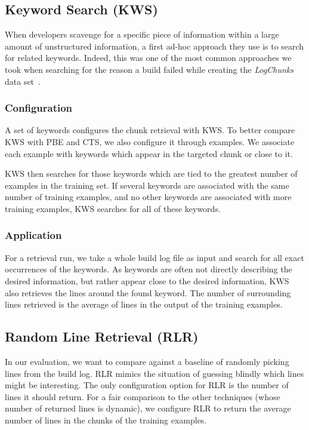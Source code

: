 \subsection{Keyword Search (KWS)}
\label{sec:expl-skws}
When developers scavenge for a specific piece of information within a
large amount of unstructured information, a first ad-hoc approach they
use is to search for related keywords.
Indeed, this was one of the
most common approaches we took when searching for the reason a build
failed while creating the \emph{LogChunks} data
set~\cite{brandt2020logchunks}.

\subsubsection{Configuration}
A set of keywords configures the chunk retrieval with KWS\@.
To better
compare KWS with PBE and CTS, we also configure it through examples.
We associate each example with keywords which appear in the targeted
chunk or close to it.

KWS then searches for those keywords which are tied to the greatest
number of examples in the training set.
If several keywords are associated with the same number of training
examples, and no other keywords are associated with more training
examples, KWS searches for all of these keywords.

\subsubsection{Application}
For a retrieval run, we take a whole build log file as input and
search for all exact occurrences of the keywords.
As keywords are
often not directly describing the desired information, but rather
appear close to the desired information, KWS also retrieves the lines
around the found keyword.
The number of surrounding lines retrieved is
the average of lines in the output of the training examples.


\subsection{Random Line Retrieval (RLR)}
\label{sec:expl-rlr}
In our evaluation, we want to compare against a baseline of randomly
picking lines from the build log.
RLR mimics the
situation of guessing blindly which lines might be interesting.
The only configuration option for RLR is the number of lines it should
return.
For a fair comparison to the other techniques (whose number of
returned lines is dynamic), we configure RLR to return the average
number of lines in the chunks of the training examples.

